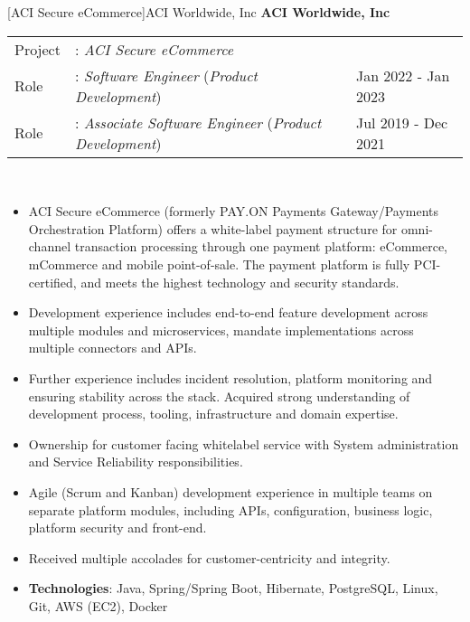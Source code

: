 \documentclass[a4paper]{article}
\begin{document}
[ACI Secure eCommerce]{ACI Worldwide, Inc}
\textbf{ACI Worldwide, Inc} \\
\noindent
\begin{tabularx}{\textwidth}{ l l>{\raggedleft\arraybackslash}X}
  Project & : \textit{ACI Secure eCommerce} & \\
  Role & : \textit{Software Engineer} (\textit{Product Development})  & Jan 2022 - Jan 2023 \\
  Role & : \textit{Associate Software Engineer} (\textit{Product Development})  & Jul 2019 - Dec 2021 \\
\end{tabularx}
\textbf{} \\
\begin{itemize} \itemsep 1pt
  \item ACI Secure eCommerce (formerly PAY.ON Payments Gateway/Payments Orchestration Platform) offers a white-label payment structure for omni-channel transaction processing through one payment platform: eCommerce, mCommerce and mobile point-of-sale. The payment platform is fully PCI-certified, and meets the highest technology and security standards.
  \item Development experience includes end-to-end feature development across multiple modules and microservices, mandate implementations across multiple connectors and APIs.
  \item Further experience includes incident resolution, platform monitoring and ensuring stability across the stack. Acquired strong understanding of development process, tooling, infrastructure and domain expertise.
  \item Ownership for customer facing whitelabel service with System administration and Service Reliability responsibilities.
  \item Agile (Scrum and Kanban) development experience in multiple teams on separate platform modules, including APIs, configuration, business logic, platform security and front-end.
  \item Received multiple accolades for customer-centricity and integrity.
  \item \textbf{Technologies}: Java, Spring/Spring Boot, Hibernate, PostgreSQL, Linux, Git, AWS (EC2), Docker
\end{itemize}

\end{document}
